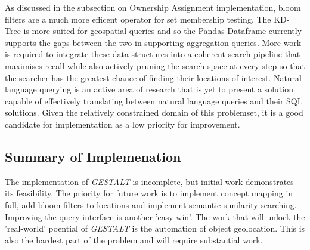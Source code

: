 As discussed in the subsection on Ownership Assignment implementation, bloom filters are a much more efficent operator for set membership testing. 
The KD-Tree is more suited for geospatial queries and so the Pandas Dataframe currently supports the gaps between the two in supporting aggregation queries. More work is required to integrate these data structures into a coherent search pipeline that maximises recall while also actively pruning the search space at every step so that the searcher has the greatest chance of finding their locations of interest. Natural language querying is an active area of research that is yet to present a solution capable of effectively translating between natural language queries and their SQL solutions. Given the relatively constrained domain of this problemset, it is a good candidate for implementation as a low priority for improvement. 

\subsection{Summary of Implemenation}
The implementation of \textit{GESTALT} is incomplete, but initial work demonstrates its feasibility. The priority for future work is to implement concept mapping in full, add bloom filters to locations and implement semantic similarity searching. Improving the query interface is another 'easy win'. The work that will unlock the 'real-world' poential of \textit{GESTALT} is the automation of object geolocation. This is also the hardest part of the problem and will require substantial work. 

